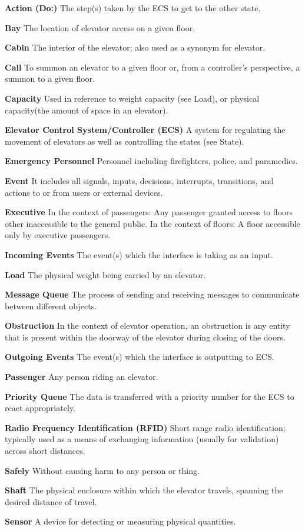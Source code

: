 \documentclass[12pt]{article}
\begin{document}
\pagebreak	
	\begin{list}{}{}
		\item{\textbf{Action (Do:)} The step(s) taken by the ECS to get to the other state.}
		\item{\textbf{Bay} The location of elevator access on a given floor.}
		\item{\textbf{Cabin} The interior of the elevator; also used as a synonym for elevator.}
		\item{\textbf{Call} To summon an elevator to a given floor or, from a controller’s perspective, a summon to a given floor.}
		\item{\textbf{Capacity} Used in reference to weight capacity (see Load), or physical capacity(the amount of space in an elevator).}
		\item{\textbf{Elevator Control System/Controller (ECS)} A system for regulating the movement of elevators as well as controlling the states (see State).}
		\item{\textbf{Emergency Personnel} Personnel including firefighters, police, and paramedics.}
		\item{\textbf{Event} It includes all signals, inputs, decisions, interrupts, transitions, and actions to or from users or external devices.}
		\item{\textbf{Executive} In the context of passengers: Any passenger granted access to floors other inaccessible to the general public. In the context of floors: A floor accessible only by executive passengers.}
		\item{\textbf{Incoming Events} The event(s) which the interface is taking as an input.}
		\item{\textbf{Load} The physical weight being carried by an elevator.}
        \item{\textbf{Message Queue} The process of sending and receiving messages to communicate between different objects.}
		\item{\textbf{Obstruction} In the context of elevator operation, an obstruction is any entity that is present within the doorway of the elevator during closing of the doors.}
		\item{\textbf{Outgoing Events} The event(s) which the interface is outputting to ECS.}
		\item{\textbf{Passenger} Any person riding an elevator.}
        \item{\textbf{Priority Queue} The data is transferred with a priority number for the ECS to react appropriately.}
		\item{\textbf{Radio Frequency Identification (RFID)} Short range radio identification; typically used as a means of exchanging information (usually for validation) across short distances.}
		\item{\textbf{Safely} Without causing harm to any person or thing.}
		\item{\textbf{Shaft}  The physical enclosure within which the elevator travels, spanning the desired distance of travel.}
		\item{\textbf{Sensor}  A device for detecting or measuring physical quantities.}
	\end{list}

\pagebreak

\end{document}

